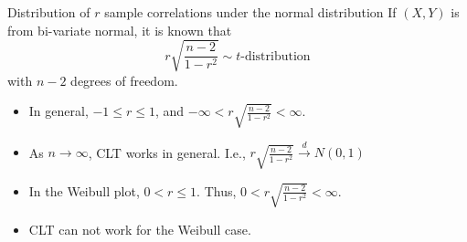 \begin{frame}   %
\begin{block}{Distribution of \(r\) sample correlations under the normal distribution}
If $(X,Y)$ is from bi-variate normal, it is known that 
\[  r\sqrt{ \frac{n-2}{1-r^2} } \sim t\text{-distribution} \]
with $n-2$ degrees of freedom.
\begin{itemize}
\item In general, $-1 \le r \le 1$, and $ -\infty < r\sqrt{\frac{n-2}{1-r^2}} < \infty$.
\item As $n \to \infty$, CLT works in general. 
      I.e., $r\sqrt{ \frac{n-2}{1-r^2} } \stackrel{d}{\to}N(0,1) $
\item In the Weibull plot,  $ 0 <  r \le 1$. 
      Thus, $0 < r\sqrt{\frac{n-2}{1-r^2}} < \infty$.
\item CLT can not work for the Weibull case.
\end{itemize}
\end{block}\end{frame}

